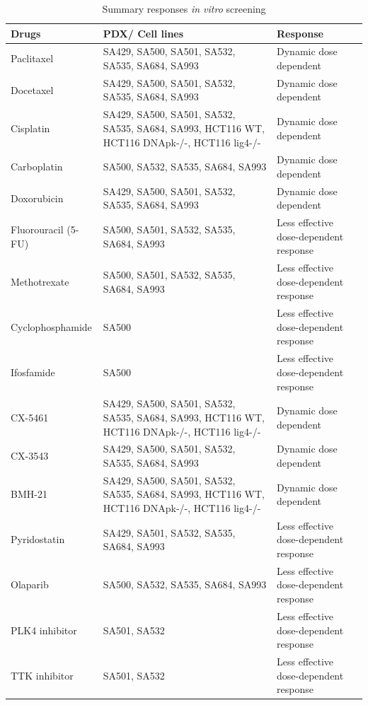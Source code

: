 \begin{table}[htbp]
  \centering
  \caption{Summary responses \textit{in vitro} screening}
    \begin{tabular}{llp{8.415em}}
    \hline
    \textbf{Drugs} & \textbf{PDX/ Cell lines } & \multicolumn{1}{l}{\textbf{Response}} \\
    \hline
    Paclitaxel & \multicolumn{1}{p{12.915em}}{SA429, SA500, SA501, SA532, SA535, SA684, SA993} & Dynamic dose dependent \\
    Docetaxel & \multicolumn{1}{p{12.915em}}{SA429, SA500, SA501, SA532, SA535, SA684, SA993} & Dynamic dose dependent \\
    Cisplatin & \multicolumn{1}{p{12.915em}}{SA429, SA500, SA501, SA532, SA535, SA684, SA993, HCT116 WT, HCT116 DNApk-/-, HCT116 lig4-/-} & Dynamic dose dependent \\
    Carboplatin & \multicolumn{1}{p{12.915em}}{SA500, SA532, SA535, SA684, SA993} & Dynamic dose dependent \\
    Doxorubicin & \multicolumn{1}{p{12.915em}}{SA429, SA500, SA501, SA532, SA535, SA684, SA993} & Dynamic dose dependent \\
    Fluorouracil (5-FU) & \multicolumn{1}{p{12.915em}}{SA500, SA501, SA532, SA535, SA684, SA993} & Less effective dose-dependent response \\
    Methotrexate & \multicolumn{1}{p{12.915em}}{SA500, SA501, SA532, SA535, SA684, SA993} & Less effective dose-dependent response \\
    Cyclophosphamide & SA500 & Less effective dose-dependent response \\
    Ifosfamide & SA500 & Less effective dose-dependent response \\
    CX-5461 & \multicolumn{1}{p{12.915em}}{SA429, SA500, SA501, SA532, SA535, SA684, SA993, HCT116 WT, HCT116 DNApk-/-, HCT116 lig4-/-} & Dynamic dose dependent \\
    CX-3543 & \multicolumn{1}{p{12.915em}}{SA429, SA500, SA501, SA532, SA535, SA684, SA993} & Dynamic dose dependent \\
    BMH-21 & \multicolumn{1}{p{12.915em}}{SA429, SA500, SA501, SA532, SA535, SA684, SA993, HCT116 WT, HCT116 DNApk-/-, HCT116 lig4-/-} & Dynamic dose dependent \\
    Pyridostatin & \multicolumn{1}{p{12.915em}}{SA429, SA501, SA532, SA535, SA684, SA993} & Less effective dose-dependent response \\
    Olaparib & \multicolumn{1}{p{12.915em}}{SA500, SA532, SA535, SA684, SA993} & Less effective dose-dependent response \\
    PLK4 inhibitor & SA501, SA532 & Less effective dose-dependent response \\
    TTK inhibitor & SA501, SA532 & Less effective dose-dependent response \\
    \hline
    \end{tabular}%
      \label{tab:addlabel}%
\end{table}%

